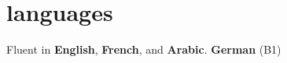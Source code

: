 \documentclass[12pt,a4paper,roman]{moderncv}
\begin{document}


\section{languages}

\hspace{25mm}Fluent in \textbf{English}, \textbf{French}, and \textbf{Arabic}. \textbf{German} (B1)




\end{document}
